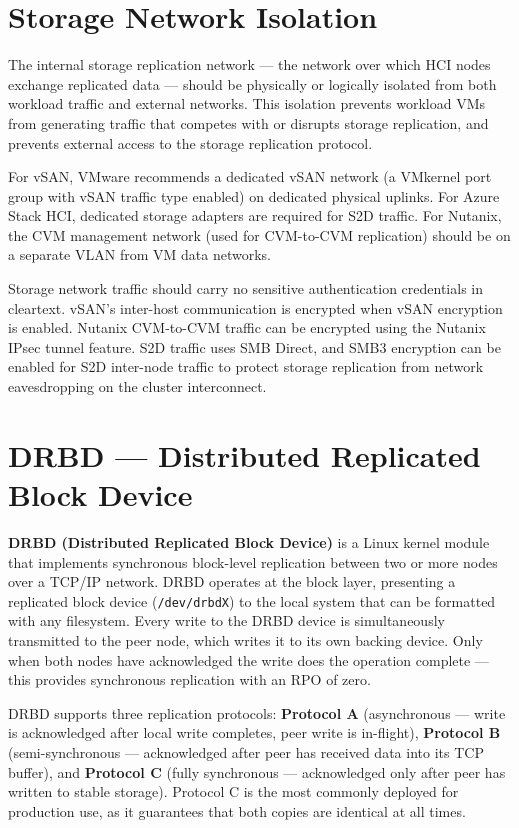 \section{Storage Network Isolation}
The internal storage replication network --- the network over which HCI nodes exchange replicated data --- should be physically or logically isolated from both workload traffic and external networks. This isolation prevents workload VMs from generating traffic that competes with or disrupts storage replication, and prevents external access to the storage replication protocol.

For vSAN, VMware recommends a dedicated vSAN network (a VMkernel port group with vSAN traffic type enabled) on dedicated physical uplinks. For Azure Stack HCI, dedicated storage adapters are required for S2D traffic. For Nutanix, the CVM management network (used for CVM-to-CVM replication) should be on a separate VLAN from VM data networks.

Storage network traffic should carry no sensitive authentication credentials in cleartext. vSAN's inter-host communication is encrypted when vSAN encryption is enabled. Nutanix CVM-to-CVM traffic can be encrypted using the Nutanix IPsec tunnel feature. S2D traffic uses SMB Direct, and SMB3 encryption can be enabled for S2D inter-node traffic to protect storage replication from network eavesdropping on the cluster interconnect.


\section{DRBD --- Distributed Replicated Block Device}

\textbf{DRBD (Distributed Replicated Block Device)} is a Linux kernel module that implements synchronous block-level replication between two or more nodes over a TCP/IP network. DRBD operates at the block layer, presenting a replicated block device (\texttt{/dev/drbdX}) to the local system that can be formatted with any filesystem. Every write to the DRBD device is simultaneously transmitted to the peer node, which writes it to its own backing device. Only when both nodes have acknowledged the write does the operation complete --- this provides synchronous replication with an RPO of zero.

DRBD supports three replication protocols: \textbf{Protocol A} (asynchronous --- write is acknowledged after local write completes, peer write is in-flight), \textbf{Protocol B} (semi-synchronous --- acknowledged after peer has received data into its TCP buffer), and \textbf{Protocol C} (fully synchronous --- acknowledged only after peer has written to stable storage). Protocol C is the most commonly deployed for production use, as it guarantees that both copies are identical at all times.

